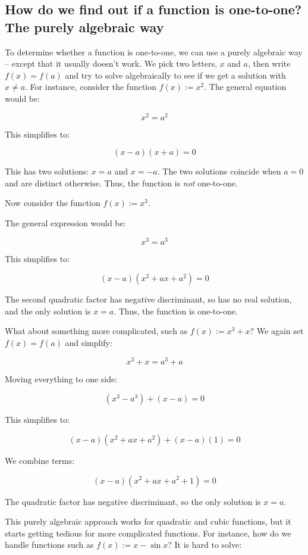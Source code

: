\documentclass[10pt]{amsart}
\begin{document}
\subsection{How do we find out if a function is one-to-one? The purely algebraic way}

To determine whether a function is one-to-one, we can use a purely
algebraic way -- except that it usually doesn't work. We pick two
letters, $x$ and $a$, then write $f(x) = f(a)$ and try to solve
algebraically to see if we get a solution with $x \ne a$. For
instance, consider the function $f(x) := x^2$. The general equation
would be:

$$x^2 = a^2$$

This simplifies to:

$$(x - a)(x + a) = 0$$

This has two solutions: $x = a$ and $x = -a$. The two solutions
coincide when $a = 0$ and are distinct otherwise. Thus, the function
is {\em not} one-to-one.

Now consider the function $f(x) := x^3$.

The general expression would be:

$$x^3 = a^3$$

This simplifies to:

$$(x - a)(x^2 + ax + a^2) = 0$$

The second quadratic factor has negative discriminant, so has no real
solution, and the only solution is $x = a$. Thus, the function is
one-to-one.

What about something more complicated, such as $f(x) := x^3 + x$? We
again set $f(x) = f(a)$ and simplify:

$$x^3 + x = a^3 + a$$

Moving everything to one side:

$$(x^3 - a^3) + (x - a) = 0$$

This simplifies to:

$$(x - a)(x^2 + ax + a^2) + (x - a)(1) = 0$$

We combine terms:

$$(x - a)(x^2 + ax + a^2 + 1) = 0$$

The quadratic factor has negative discriminant, so the only solution
is $x = a$.

This purely algebraic approach works for quadratic and cubic
functions, but it starts getting tedious for more complicated
functions. For instance, how do we handle functions such as $f(x) := x
- \sin x$? It is hard to solve:
\end{document}
